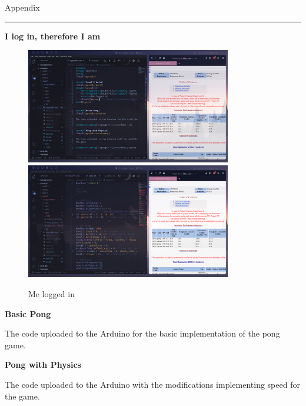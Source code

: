\newpage
{\large Appendix}
\hrule
\label{appendix}

\textbf{I log in, therefore I am}
\label{appendix:proof}
\begin{figure}[ht]
    \centering
    \includegraphics[width=0.8\textwidth]{fig/me.png}
    \includegraphics[width=0.8\textwidth]{fig/me2.png}
    \caption{Me logged in}
    \label{fig:sso}
\end{figure}


\textbf{Basic Pong}
\label{appendix:arduino}

The code uploaded to the Arduino for the basic implementation of the pong game.



\textbf{Pong with Physics}
\label{appendix:arduinophy}

The code uploaded to the Arduino with the modifications implementing speed for
the game.



